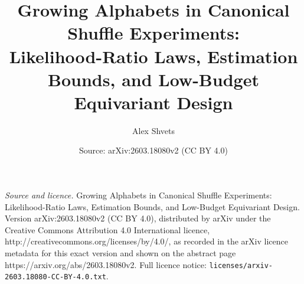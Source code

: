\documentclass[10pt,a4paper]{amsart}
\title{Growing Alphabets in Canonical Shuffle Experiments:\\ Likelihood-Ratio Laws, Estimation Bounds, and Low-Budget Equivariant Design}
\author{Alex Shvets}
\date{Source: arXiv:2603.18080v2 (CC BY 4.0)}
\begin{document}
\maketitle

\noindent\emph{Source and licence.} Growing Alphabets in Canonical Shuffle Experiments:\\ Likelihood-Ratio Laws, Estimation Bounds, and Low-Budget Equivariant Design. Version arXiv:2603.18080v2 (CC BY 4.0), distributed by arXiv under the Creative Commons Attribution 4.0 International licence, http://creativecommons.org/licenses/by/4.0/, as recorded in the arXiv licence metadata for this exact version and shown on the abstract page https://arxiv.org/abs/2603.18080v2. Full licence notice: \texttt{licenses/arxiv-2603.18080-CC-BY-4.0.txt}.\par\smallskip
\end{document}
